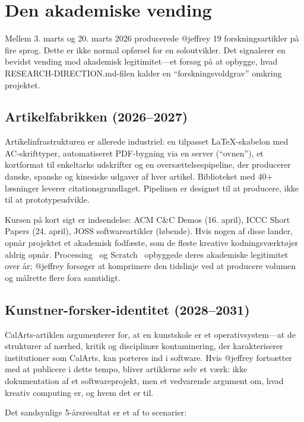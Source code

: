 \documentclass[10pt,letterpaper,twocolumn]{article}
\begin{document}
\section{Den akademiske vending}
\label{sec:scholarly}

Mellem 3. marts og 20. marts 2026 producerede @jeffrey 19 forskningsartikler på fire sprog. Dette er ikke normal opførsel for en soloutvikler. Det signalerer en bevidst vending mod akademisk legitimitet---et forsøg på at opbygge, hvad RESEARCH-DIRECTION.md-filen kalder en ``forskningsvoldgrav'' omkring projektet.

\subsection{Artikelfabrikken (2026--2027)}

Artikelinfrastrukturen er allerede industriel: en tilpasset \LaTeX{}-skabelon med AC-skrifttyper, automatiseret PDF-bygning via en server (``ovnen''), et kortformat til enkeltarks udskrifter og en oversættelsespipeline, der producerer danske, spanske og kinesiske udgaver af hver artikel. Biblioteket med 40+ læsninger leverer citationsgrundlaget. Pipelinen er designet til at producere, ikke til at prototypeudvikle.

Kursen på kort sigt er indsendelse: ACM C\&C Demos (16. april), ICCC Short Papers (24. april), JOSS softwareartikler (løbende). Hvis nogen af disse lander, opnår projektet et akademisk fodfæste, som de fleste kreative kodningsværktøjer aldrig opnår. Processing~\citep{reas2007processing} og Scratch~\citep{resnick2009scratch} opbyggede deres akademiske legitimitet over år; @jeffrey forsøger at komprimere den tidslinje ved at producere volumen og målrette flere fora samtidigt.

\subsection{Kunstner-forsker-identitet (2028--2031)}

CalArts-artiklen argumenterer for, at en kunstskole er et operativsystem---at de strukturer af nærhed, kritik og disciplinær kontaminering, der karakteriserer institutioner som CalArts, kan porteres ind i software. Hvis @jeffrey fortsætter med at publicere i dette tempo, bliver artiklerne selv et værk: ikke dokumentation af et softwareprojekt, men et vedvarende argument om, hvad kreativ computing er, og hvem det er til.

Det sandsynlige 5-årsresultat er et af to scenarier:
\end{document}
